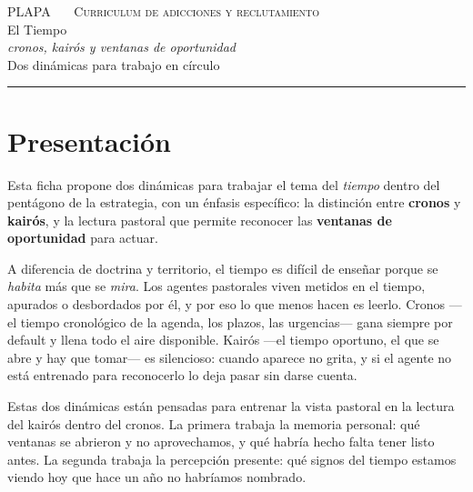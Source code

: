 \documentclass[11pt, a4paper]{article}
\begin{document}

\thispagestyle{plain}
\begin{center}
  \vspace*{1.5em}
  {\color{tenue}\scshape\small PLAPA \ \textbullet\ \ Curriculum de adicciones y reclutamiento}\\
  \vspace{2em}
  {\color{tiempoAmbar}\Huge El Tiempo}\\[0.35em]
  {\color{tinte}\LARGE\itshape cronos, kairós y ventanas de oportunidad}\\
  \vspace{1.4em}
  {\color{tenue}\large Dos dinámicas para trabajo en círculo}\\
  \vspace{0.6em}
  {\color{regla}\rule{0.35\linewidth}{0.5pt}}
\end{center}

\vspace{2em}

\section*{Presentación}

Esta ficha propone dos dinámicas para trabajar el tema del \emph{tiempo} dentro del pentágono de la estrategia, con un énfasis específico: la distinción entre \textbf{cronos} y \textbf{kairós}, y la lectura pastoral que permite reconocer las \textbf{ventanas de oportunidad} para actuar.

A diferencia de doctrina y territorio, el tiempo es difícil de enseñar porque se \emph{habita} más que se \emph{mira}. Los agentes pastorales viven metidos en el tiempo, apurados o desbordados por él, y por eso lo que menos hacen es leerlo. Cronos ---el tiempo cronológico de la agenda, los plazos, las urgencias--- gana siempre por default y llena todo el aire disponible. Kairós ---el tiempo oportuno, el que se abre y hay que tomar--- es silencioso: cuando aparece no grita, y si el agente no está entrenado para reconocerlo lo deja pasar sin darse cuenta.

Estas dos dinámicas están pensadas para entrenar la vista pastoral en la lectura del kairós dentro del cronos. La primera trabaja la memoria personal: qué ventanas se abrieron y no aprovechamos, y qué habría hecho falta tener listo antes. La segunda trabaja la percepción presente: qué signos del tiempo estamos viendo hoy que hace un año no habríamos nombrado.
\end{document}
